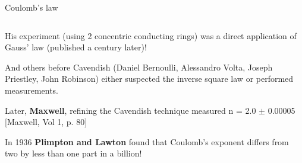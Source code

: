 \begin{frame}{Coulomb's law}
\begin{columns}[t]
\begin{column}{0.80\textwidth}
\begin{itemize}
{\begin{itemize}
{      \item His experiment (using 2 concentric conducting rings) was a
            direct application of Gauss' law (published a century later)!
     }
     \end{itemize}
     \vspace{0.2cm}
     \item
     And others before Cavendish (Daniel Bernoulli, Alessandro Volta,
     Joseph Priestley, John Robinson) either suspected the
     inverse square law or performed measurements.\\
     \vspace{0.2cm}
     \item
     Later, {\bf Maxwell}, refining the Cavendish technique measured
     {\color{red} n = 2.0 $\pm$ 0.00005} [Maxwell, Vol 1,  p. 80]\\
     \vspace{0.2cm}
     \item
     In 1936 {\bf Plimpton and Lawton} found that Coulomb's exponent
     {\color{red} differs from two by less than one part in a billion!}
    }
    \end{itemize}
  \end{column}
\end{columns}

\end{frame}


%
%

